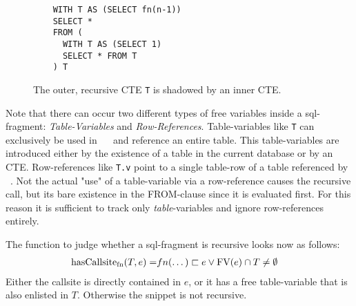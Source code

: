 \begin{wrapfigure}{r}{0.4\textwidth}
    \begin{verbatim}
    WITH T AS (SELECT fn(n-1))
    SELECT *
    FROM (
      WITH T AS (SELECT 1)
      SELECT * FROM T
    ) T
    \end{verbatim}
    \caption{The outer, recursive CTE \texttt{T} is shadowed by an inner CTE.}
    \label{lst:indirect_callsite_ref}
\end{wrapfigure}

Note that there can occur two different types of free variables inside a sql-fragment: \textit{Table-Variables} and \textit{Row-References}. Table-variables like \texttt{T} can exclusively be used in ~\FROM~ and reference an entire table. This table-variables are introduced either by the existence of a table in the current database or by an CTE. Row-references like \texttt{T.v} point to a single table-row of a table referenced by ~\FROM. Not the actual "use" of a table-variable via a row-reference causes the recursive call, but its bare existence in the FROM-clause since it is evaluated first. For this reason it is sufficient to track only \textit{table}-variables and ignore row-references entirely.

The function to judge whether a sql-fragment is recursive looks now as follows:
\begin{align*}
    \operatorname{\text{hasCallsite}_{fn}}(T, e) =& fn(\dots) \sqsubset e \lor \operatorname{\text{\rm FV}}(e) \cap T \neq \emptyset
\end{align*}
Either the callsite is directly contained in $e$, or it has a free table-variable that is also enlisted in $T$. Otherwise the snippet is not recursive.



